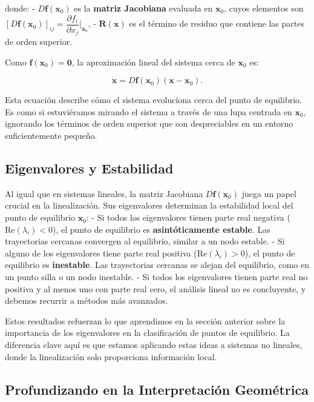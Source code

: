 donde:
- $D\mathbf{f}(\mathbf{x}_0)$ es la \textbf{matriz Jacobiana} evaluada en $\mathbf{x}_0$, cuyos elementos son $\left[ D\mathbf{f}(\mathbf{x}_0) \right]_{ij} = \dfrac{\partial f_i}{\partial x_j} \bigg|_{\mathbf{x}_0}$,
- $\mathbf{R}(\mathbf{x})$ es el término de residuo que contiene las partes de orden superior.

Como $\mathbf{f}(\mathbf{x}_0) = \mathbf{0}$, la aproximación lineal del sistema cerca de $\mathbf{x}_0$ es:

\begin{equation}\label{eq:sistema_linealizado}
    \dot{\mathbf{x}} = D\mathbf{f}(\mathbf{x}_0)(\mathbf{x} - \mathbf{x}_0).
\end{equation}

Esta ecuación describe cómo el sistema evoluciona cerca del punto de equilibrio. Es como si estuviéramos mirando el sistema a través de una lupa centrada en $\mathbf{x}_0$, ignorando los términos de orden superior que son despreciables en un entorno suficientemente pequeño.

\subsection{Eigenvalores y Estabilidad}

Al igual que en sistemas lineales, la matriz Jacobiana $D\mathbf{f}(\mathbf{x}_0)$ juega un papel crucial en la linealización. Sus eigenvalores determinan la estabilidad local del punto de equilibrio $\mathbf{x}_0$:
- Si todos los eigenvalores tienen parte real negativa ($\text{Re}(\lambda_i) < 0$), el punto de equilibrio es \textbf{asintóticamente estable}. Las trayectorias cercanas convergen al equilibrio, similar a un nodo estable.
- Si alguno de los eigenvalores tiene parte real positiva ($\text{Re}(\lambda_i) > 0$), el punto de equilibrio es \textbf{inestable}. Las trayectorias cercanas se alejan del equilibrio, como en un punto silla o un nodo inestable.
- Si todos los eigenvalores tienen parte real no positiva y al menos uno con parte real cero, el análisis lineal no es concluyente, y debemos recurrir a métodos más avanzados.

Estos resultados refuerzan lo que aprendimos en la sección anterior sobre la importancia de los eigenvalores en la clasificación de puntos de equilibrio. La diferencia clave aquí es que estamos aplicando estas ideas a sistemas no lineales, donde la linealización solo proporciona información local.

\subsection{Profundizando en la Interpretación Geométrica}

